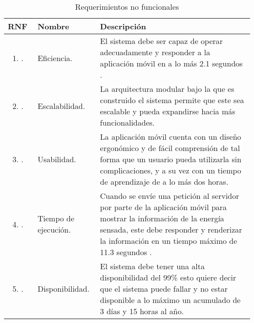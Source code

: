 \begin{longtable}{|M{1.6cm}|M{4.0cm}|M{6.0cm}|}
    \caption{Requerimientos no funcionales}
	\hline
	\textbf{RNF} & \textbf{Nombre} & \textbf{Descripción} \\
	\hline
 	\begin{enumerate}[label=RNF\arabic*]
 	    \item.
 	\end{enumerate}
 	& Eficiencia.
 	& El sistema debe ser capaz de operar adecuadamente y responder a la aplicación móvil en a lo más 2.1 segundos \citep{AveragePageLoadTimes}.\\
    \hline
    \begin{enumerate}[label=RNF\arabic*]
        \setcounter{enumi}{1}
 	    \item.
 	\end{enumerate}
 	& Escalabilidad.
 	& La arquitectura modular bajo la que es construido el sistema permite que este sea escalable y pueda expandirse hacia más funcionalidades.\\
    \hline
    \begin{enumerate}[label=RNF\arabic*]
        \setcounter{enumi}{2}
 	    \item.
 	\end{enumerate}
 	& Usabilidad. 
 	& La aplicación móvil cuenta con un diseño ergonómico y de fácil comprensión de tal forma que un usuario pueda utilizarla sin complicaciones, y a su vez con un tiempo de aprendizaje de a lo más dos horas.\\
    \hline
    \begin{enumerate}[label=RNF\arabic*]
        \setcounter{enumi}{3}
 	    \item.
 	\end{enumerate}
 	& Tiempo de ejecución.
 	& Cuando se envíe una petición al servidor por parte de la aplicación móvil para mostrar la información de la energía sensada, este debe responder y renderizar la información en un tiempo máximo de 11.3 segundos \citep{AveragePageLoadTimes}.  \\
    \hline
    \begin{enumerate}[label=RNF\arabic*]
        \setcounter{enumi}{4}
 	    \item.
 	\end{enumerate}
 	& Disponibilidad.
 	& El sistema debe tener una alta disponibilidad del 99\% esto quiere decir que el sistema puede fallar y no estar disponible a lo máximo un acumulado de 3 días y 15 horas al año.  \\
    \hline

\end{longtable}
